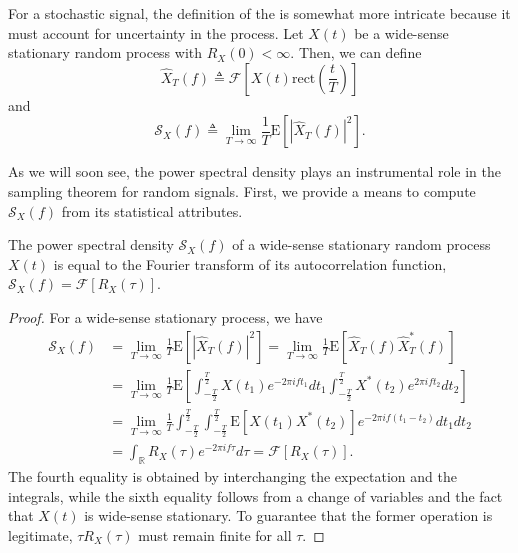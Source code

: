 For a stochastic signal, the definition of the  is somewhat more intricate because it must account for uncertainty in the process.
Let $X(t)$ be a wide-sense stationary random process with $R_X(0) < \infty$.
Then, we can define
\begin{equation*}
\hat{X}_T(f) \triangleq \mathcal{F} \left[ X(t) \mathrm{rect} \left( \frac{t}{T} \right) \right] 
\end{equation*}
and
\begin{equation*}
\mathcal{S}_X(f) \triangleq \lim_{T \rightarrow \infty} \frac{1}{T} \mathrm{E} \left[ |\hat{X}_T(f)|^2 \right] .
\end{equation*}

As we will soon see, the power spectral density plays an instrumental role in the sampling theorem for random signals.
First, we provide a means to compute $\mathcal{S}_X(f)$ from its statistical attributes.

\begin{theorem} \label{theorem:WienerKhinchin}
The power spectral density $\mathcal{S}_X (f)$ of a wide-sense stationary random process $X(t)$ is equal to the Fourier transform of its autocorrelation function, $\mathcal{S}_X (f) = \mathcal{F} [R_X (\tau)]$.
\end{theorem}
\begin{proof}
For a wide-sense stationary process, we have
\begin{equation*}
\begin{split}
\mathcal{S}_X(f) &= \lim_{T \rightarrow \infty} \frac{1}{T} \mathrm{E} \left[ |\hat{X}_T(f)|^2 \right]
= \lim_{T \rightarrow \infty} \frac{1}{T} \mathrm{E} \left[ \hat{X}_T(f) \hat{X}_T^*(f) \right] \\
&= \lim_{T \rightarrow \infty} \frac{1}{T} \mathrm{E} \left[
\int_{-\frac{T}{2}}^{\frac{T}{2}} X(t_1) e^{-2 \pi i f t_1} dt_1
\int_{-\frac{T}{2}}^{\frac{T}{2}} X^*(t_2) e^{2 \pi i f t_2} dt_2 \right] \\
&= \lim_{T \rightarrow \infty} \frac{1}{T}
\int_{-\frac{T}{2}}^{\frac{T}{2}} \int_{-\frac{T}{2}}^{\frac{T}{2}}
\mathrm{E} \left[ X(t_1) X^*(t_2) \right]
e^{-2 \pi i f (t_1-t_2)} dt_1 dt_2 \\
&= \int_{\mathbb{R}} R_X (\tau) e^{-2 \pi i f\tau} d\tau
= \mathcal{F} [ R_X (\tau) ] .
\end{split}
\end{equation*}
The fourth equality is obtained by interchanging the expectation and the integrals, while the sixth equality follows from a change of variables and the fact that $X(t)$ is wide-sense stationary.
To guarantee that the former operation is legitimate, $\tau R_X(\tau)$ must remain finite for all $\tau$.
\end{proof}

